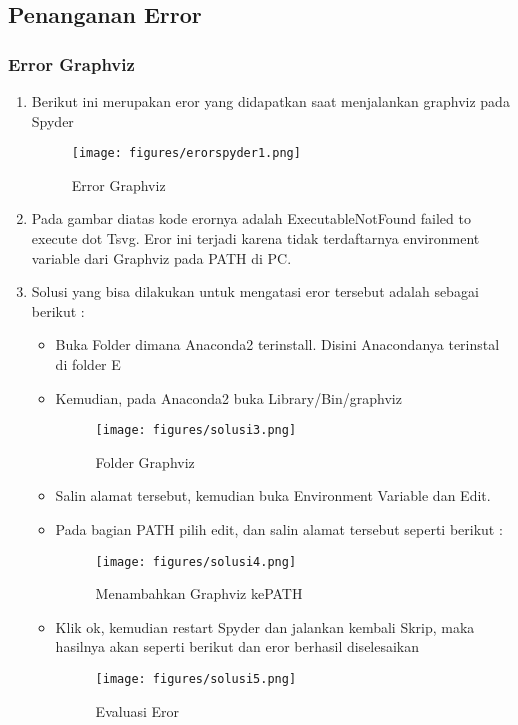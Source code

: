 \subsection{Penanganan Error}
\subsubsection{Error Graphviz}
\begin{enumerate}
	\item
Berikut ini merupakan eror yang didapatkan saat menjalankan graphviz pada Spyder
\begin{figure}[ht]
\centering
\texttt{[image: figures/erorspyder1.png]}
\caption{Error Graphviz}
\label{Error}
\end{figure}
	\item
Pada gambar diatas kode erornya adalah ExecutableNotFound failed to execute dot Tsvg. Eror ini terjadi karena tidak terdaftarnya environment variable dari Graphviz pada PATH di PC.
	\item
Solusi yang bisa dilakukan untuk mengatasi eror tersebut adalah sebagai berikut : \\
\begin{itemize}
\item
Buka Folder dimana Anaconda2 terinstall. Disini Anacondanya terinstal di folder E
\item
Kemudian, pada Anaconda2 buka Library/Bin/graphviz
\begin{figure}[ht]
\centering
\texttt{[image: figures/solusi3.png]}
\caption{Folder Graphviz}
\label{Eror}
\end{figure}
\item
Salin alamat tersebut, kemudian buka Environment Variable dan Edit. 
\item
Pada bagian PATH pilih edit, dan salin alamat tersebut seperti berikut :
\begin{figure}[ht]
\centering
\texttt{[image: figures/solusi4.png]}
\caption{Menambahkan Graphviz kePATH}
\label{Eror}
\end{figure}
\item
Klik ok, kemudian restart Spyder dan jalankan kembali Skrip, maka hasilnya akan seperti berikut dan eror berhasil diselesaikan
\begin{figure}[ht]
\centering
\texttt{[image: figures/solusi5.png]}
\caption{Evaluasi Eror}
\label{Eror}
\end{figure}
\end{itemize}
\end{enumerate}

